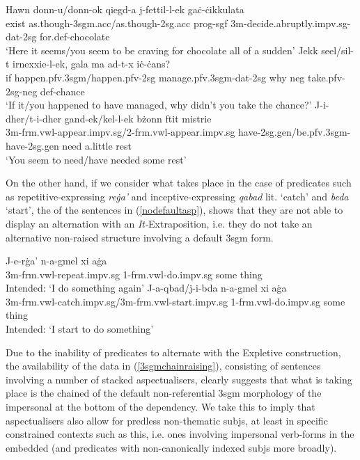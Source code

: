 \documentclass[output=paper]{LSP/langsci}
\begin{document}
\ea \label{ambig}
\ea
\gll Hawn donn-u/donn-ok qieg\textcrh d-a j-fettil-l-ek g\textcrh a{\.c}-{\.c}ikkulata\\
{\sc exist} as.though-{\sc 3sgm.acc}/as.though-{\sc 2sg.acc} {\sc prog-sgf} 3{\sc m}-decide.abruptly.{\sc impv.sg-dat-2sg} for.{\sc def-}chocolate\\
\glt `Here it seems/you seem to be craving for chocolate all of a sudden'
\ex
\gll Jekk se\textcrh el/s\textcrh il-t irnexxie-l-ek, g\textcrh ala ma \textcrh ad-t-x i{\.c}-{\.c}ans?\\
if happen.{\sc pfv.3sgm}/happen.{\sc pfv-2sg} manage.{\sc pfv.3sgm-dat-2sg} why {\sc neg} take.{\sc pfv-2sg-neg} {\sc def-}chance\\
\glt `If it/you happened to have managed, why didn't you take the chance?'
\ex
\gll J-i-dher/t-i-dher g\textcrh and-ek/kel-l-ek b{\.z}onn ftit mistrie\textcrh\\
3{\sc m}-{\sc frm.vwl}-appear.{\sc impv.sg}/2-{\sc frm.vwl}-appear.{\sc impv.sg} have-{\sc 2sg.gen}/be.{\sc pfv.3sgm}-have-{\sc 2sg.gen} need a.little rest\\
\glt `You seem to need/have needed some rest'
\z
\z 

On the other hand, if we consider what takes place in the case of  predicates such as {\sc repetitive}-expressing \emph{re{\.g}a'} and {\sc inceptive}-expressing \emph{qabad} lit. `catch' and \emph{beda} `start', 
the  of the sentences in (\ref{nodefaultasp}), %
shows that they are not able to display an alternation with an \emph{It-}Extraposition, i.e. they do not take an alternative non-raised structure involving a default {\sc 3sgm} form. 

\ea \label{nodefaultasp}
\ea
\gll *J-e-r{\.g}a' n-a-g\textcrh mel xi \textcrh a{\.g}a\\
3{\sc m}-{\sc frm.vwl}-repeat.{\sc impv.sg} 1-{\sc frm.vwl}-do.{\sc impv.sg} some thing\\
\glt Intended: `I do something again'
\ex
\gll *J-a-qbad/j-i-bda n-a-g\textcrh mel xi \textcrh a{\.g}a\\
3{\sc m}-{\sc frm.vwl}-catch.{\sc impv.sg}/3{\sc m}-{\sc frm.vwl}-start.{\sc impv.sg} 1-{\sc frm.vwl}-do.{\sc impv.sg} some thing\\
\glt Intended: `I start to do something'
\z
\z
 
Due to the inability of  predicates
to alternate with the Expletive construction, the availability of the data in (\ref{3sgmchainraising}), consisting of sentences involving a number of stacked aspectualisers, clearly suggests that what is 
taking place is the chained  of the default non-referential {\sc 3sgm} morphology of the impersonal  at the bottom of the dependency. We take this to imply that aspectualisers also allow for {\sc pred}less non-thematic {\sc subj}s, at least in specific constrained contexts such as this, i.e. ones involving impersonal verb-forms in the embedded  (and predicates with non-canonically indexed {\sc subj}s more broadly).
\end{document}
